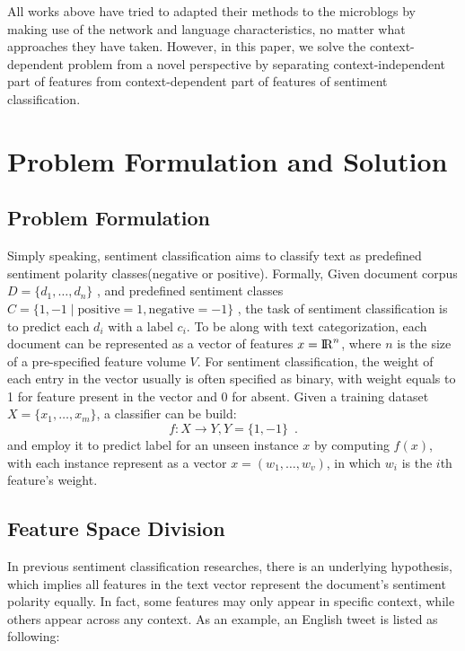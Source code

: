 \documentclass{llncs}
\begin{document}
All works above have tried to adapted their methods to the microblogs by making use of the network and language characteristics, no matter what approaches they have taken. However, in this paper, we solve the context-dependent problem from a novel perspective by separating context-independent part of features from context-dependent part of features of sentiment classification.
\section{Problem Formulation and Solution}
\label{problem}
\subsection{Problem Formulation}
\label{formulation}
Simply speaking, sentiment classification aims to classify text as predefined sentiment polarity classes(negative or positive).  
Formally, Given document corpus $ D=\lbrace d_{1},\dots ,d_{n} \rbrace$ , and predefined sentiment classes $ C=\lbrace 1,-1\mid \mathrm{positive}=1,\mathrm{negative}=-1 \rbrace$ , the task of sentiment classification is to predict each $ d_{i} $ with a label $ c_{i} $. 
To be along with text categorization, each document can be represented as a vector of features $ x={\rm I\!R}^{n} $, where $ n $ is the size of a pre-specified feature volume $ V $. 
For sentiment classification, the weight of each entry in the vector usually is often specified as binary, with weight equals to 1 for feature present in the vector and 0 for absent. 
Given a training dataset $ X=\lbrace x_{1},\dots,x_{m} \rbrace $, a classifier can be build:
\begin{equation}
\label{e1}
  f:X \longrightarrow Y, Y=\lbrace 1,-1 \rbrace \enspace .
\end{equation} 
and employ it to predict label for an unseen instance $ x $ by computing $ f \left( x \right)   $, with each instance represent as a vector $ x=\left( w_{1},\dots,w_{v} \right)  $, in which $ w_{i} $ is the $ i $th feature’s weight. 
\subsection{Feature Space Division}
\label{division}
In previous sentiment classification researches, there is an underlying hypothesis, which implies all features in the text vector represent the document’s sentiment polarity equally. 
In fact, some features may only appear in specific context, while others appear across any context. 
As an example, an English tweet is listed as following:
\end{document}
